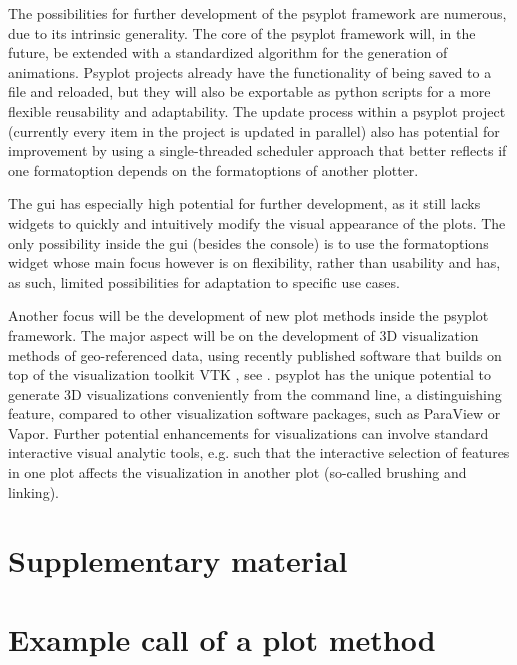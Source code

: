 \begin{refsection}
The possibilities for further development of the psyplot framework are numerous, due to its intrinsic generality. The core of the psyplot framework will, in the future, be extended with a standardized algorithm  for the generation of animations. Psyplot projects already have the functionality of being saved to a file and reloaded, but they will also be exportable as python scripts for a more flexible reusability and adaptability. The update process within a psyplot project (currently every item in the project is updated in parallel) also has potential for improvement by using a single-threaded scheduler approach that better reflects if one formatoption depends on the formatoptions of another plotter.

The \gls{gui} has especially high potential for further development, as it still lacks widgets to quickly and intuitively modify the visual appearance of the plots. The only possibility inside the \gls{gui} (besides the console) is to use the formatoptions widget whose main focus however is on flexibility, rather than usability and has, as such, limited possibilities for adaptation to specific use cases.

Another focus will be the development of new plot methods inside the psyplot framework. The major aspect will be on the development of 3D visualization methods of geo-referenced data, using recently published software that builds on top of the visualization toolkit VTK \citep{SullivanKaszynski2019, SullivanTrainorGuitton2019}, see \cite{Sommer2019a}. psyplot has the unique potential to generate 3D visualizations conveniently from the command line, a distinguishing feature, compared to other visualization software packages, such as ParaView or Vapor. Further potential enhancements for visualizations can involve standard interactive visual analytic tools, e.g. such that the interactive selection of features in one plot affects the visualization in another plot (so-called brushing and linking).

\clearpage

\begin{subappendices}
	\section*{Supplementary material}
	\section{Example call of a plot method}  \label{sec:psyplot-example}
	

\end{subappendices}
\end{refsection}
